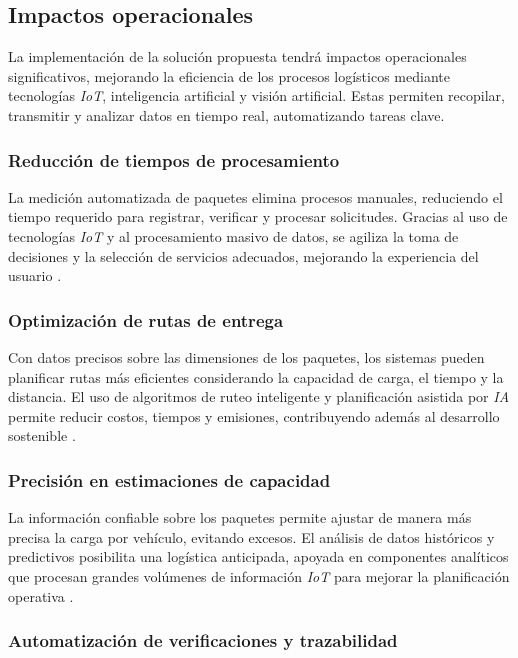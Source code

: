 \subsection{Impactos operacionales}

La implementación de la solución propuesta tendrá impactos operacionales significativos, mejorando la eficiencia de los procesos logísticos mediante tecnologías \textit{IoT}, inteligencia artificial y visión artificial. Estas permiten recopilar, transmitir y analizar datos en tiempo real, automatizando tareas clave.

\subsubsection{Reducción de tiempos de procesamiento}

La medición automatizada de paquetes elimina procesos manuales, reduciendo el tiempo requerido para registrar, verificar y procesar solicitudes. Gracias al uso de tecnologías \textit{IoT} y al procesamiento masivo de datos, se agiliza la toma de decisiones y la selección de servicios adecuados, mejorando la experiencia del usuario \cite{RedaccinTLW2024, Sun2024, Wang2012}.

\subsubsection{Optimización de rutas de entrega}

Con datos precisos sobre las dimensiones de los paquetes, los sistemas pueden planificar rutas más eficientes considerando la capacidad de carga, el tiempo y la distancia. El uso de algoritmos de ruteo inteligente y planificación asistida por \textit{IA} permite reducir costos, tiempos y emisiones, contribuyendo además al desarrollo sostenible \cite{WebRef132365}.

\subsubsection{Precisión en estimaciones de capacidad}

La información confiable sobre los paquetes permite ajustar de manera más precisa la carga por vehículo, evitando excesos. El análisis de datos históricos y predictivos posibilita una logística anticipada, apoyada en componentes analíticos que procesan grandes volúmenes de información \textit{IoT} para mejorar la planificación operativa \cite{Alharbi2023, WebRef132362}.

\subsubsection{Automatización de verificaciones y trazabilidad}

